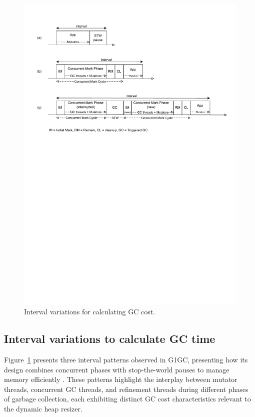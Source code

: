 \begin{figure}[t]
  \centering
  \includegraphics[width=\textwidth]{fig/intervals.pdf}
  \caption{Interval variations for calculating GC cost.}
  \label{fig:intervals}
\end{figure}

\subsection{Interval variations to calculate GC time}
Figure~\ref{fig:intervals} presents three interval patterns observed in G1GC, presenting how its design combines concurrent phases with stop-the-world pauses to manage memory efficiently \cite{Detlefs2004GarbageFirst}. These patterns highlight the interplay between mutator threads, concurrent GC threads, and refinement threads during different phases of garbage collection, each exhibiting distinct GC cost characteristics relevant to the dynamic heap resizer.

